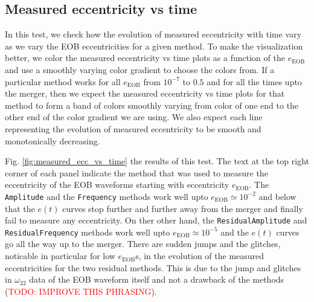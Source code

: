 \documentclass[aps,prd,amsmath,floats,floatfix, twocolumn,
superscriptaddress,nofootinbib,showpacs]{revtex4-1}
\newcommand{\red}{\textcolor{red}}
\newcommand{\TODO}[1]{\red{TODO: #1}}
\newcommand{\eEOB}{e_{\text{EOB}}}
\newcommand{\mAmp}{\texttt{Amplitude}}
\newcommand{\mFreq}{\texttt{Frequency}}
\newcommand{\mResAmp}{\texttt{ResidualAmplitude}}
\newcommand{\mResFreq}{\texttt{ResidualFrequency}}
\begin{document}
\subsection{Measured eccentricity vs time}
\label{sec:measured-eccentricity-vs-time}
In this test, we check how the evolution of measured eccentricity with
time vary as we vary the EOB eccentricities for a given method. To
make the visualization better, we color the measured eccentricity vs
time plots as a function of the $\eEOB$ and use a smoothly
varying color gradient to choose the colors from. If a particular
method works for all $\eEOB$ from $10^{-7}$ to $0.5$ and for
all the times upto the merger, then we expect the measured
eccentricity vs time plots for that method to form a band of colors
smoothly varying from color of one end to the other end of the color
gradient we are using. We also expect each line representing the
evolution of measured eccentricity to be smooth and monotonically
decreasing.

Fig. \ref{fig:measured_ecc_vs_time} the results of this test. The text
at the top right corner of each panel indicate the method that was
used to measure the eccentricity of the EOB waveforms starting with
eccentricity $\eEOB$. The \mAmp{} and the
\mFreq{} methods work well upto $\eEOB \simeq
10^{-2}$ and below that the $e(t)$ curves stop further and further
away from the merger and finally fail to measure any eccentricity. On
ther other hand, the \mResAmp{} and
\mResFreq{} methods work well upto $\eEOB
\simeq 10^{-5}$ and the $e(t)$ curves go all the way up to the
merger. There are sudden jumps and the glitches, noticable in
particular for low $\eEOB$s, in the evolution of the measured
eccentricities for the two residual methods.  This is due to the jump
and glitches in $\omega_{22}$ data of the EOB waveform itself and not
a drawback of the methods (\TODO{IMPROVE THIS PHRASING}).
\end{document}
